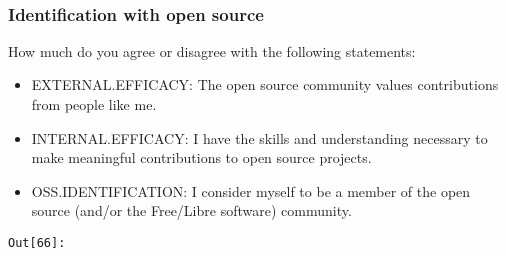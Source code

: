 \documentclass[11pt]{article}
\providecommand{\tightlist}{%
      \setlength{\itemsep}{0pt}\setlength{\parskip}{0pt}}
\begin{document}
    


    \begin{center}
    \end{center}
    { \hspace*{\fill} \\}
    

    \subsubsection{Identification with open
source}\label{identification-with-open-source}

How much do you agree or disagree with the following statements:

\begin{itemize}
\tightlist
\item
  EXTERNAL.EFFICACY: The open source community values contributions from
  people like me.
\item
  INTERNAL.EFFICACY: I have the skills and understanding necessary to
  make meaningful contributions to open source projects.
\item
  OSS.IDENTIFICATION: I consider myself to be a member of the open
  source (and/or the Free/Libre software) community.
\end{itemize}


\texttt{\color{outcolor}Out[{\color{outcolor}66}]:}
    

    


    \begin{center}
    \end{center}
    { \hspace*{\fill} \\}
    
\end{document}
